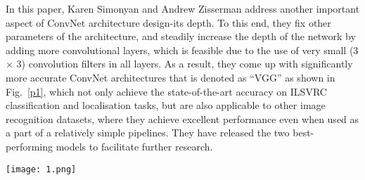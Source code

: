 \documentclass[10pt,twocolumn,letterpaper]{article}
\begin{document}
In this paper, Karen Simonyan and Andrew Zisserman address another important aspect of ConvNet architecture design-its depth. To this end, they fix other parameters of the architecture, and steadily increase the depth of the network by adding more convolutional layers, which is feasible due to the use of very small (3 $\times$ 3) convolution filters in all layers. As a result, they come up with significantly more accurate ConvNet architectures that is denoted as ``VGG'' as shown in Fig.~\ref{p1}, which not only achieve the state-of-the-art accuracy on ILSVRC classification and localisation tasks, but are also applicable to other image recognition datasets, where they achieve excellent performance even when used as a part of a relatively simple pipelines. They have released the two best-performing models to facilitate further research.
\begin{figure*}
	\begin{center}
		\texttt{[image: 1.png]}
	\end{center}
	\caption{Architecture of VGG method which is displayed by Andrew Ng in deep learning course.}
	\label{p1}
\end{figure*}
\end{document}
